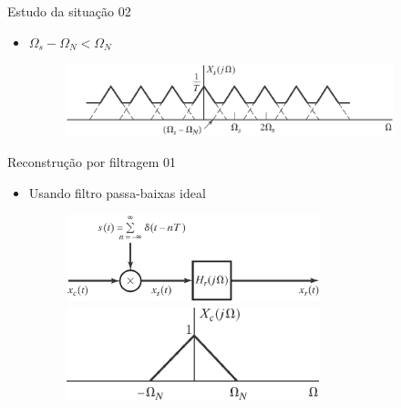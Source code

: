 \documentclass[
size=11pt,
paper=screen,
mode=present,
display=slidesnotes,
style=paintings,
nopagebreaks,
blackslide,
fleqn]{powerdot}
\begin{document}
\begin{slide}{Estudo da situação 02}
\begin{itemize}
   \item $\Omega_s-\Omega_N<\Omega_N$
   \begin{figure}
      \centering
      \includegraphics[width=0.9\textwidth]{figs/situacao02.eps}
   \end{figure}
\end{itemize}
\end{slide}

\begin{slide}{Reconstrução por filtragem 01}
\begin{itemize}
   \item Usando filtro passa-baixas ideal
   \begin{figure}
      \centering
      \includegraphics[width=0.7\textwidth]{figs/sistamostragem1.eps}
      \includegraphics[width=0.7\textwidth]{figs/sistamostragem2.eps}
   \end{figure}
\end{itemize}
\end{slide}
\end{document}
